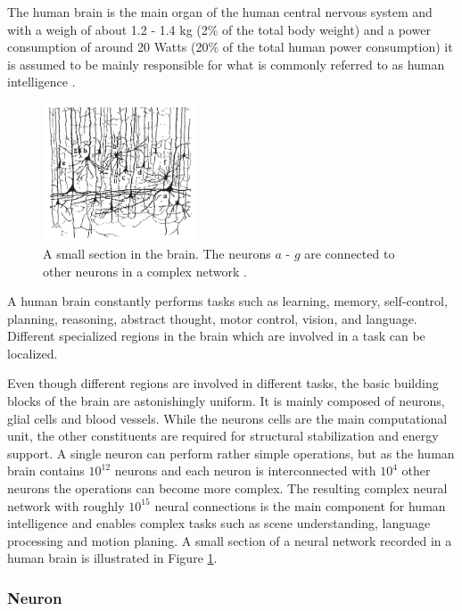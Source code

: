 The human brain is the main organ of the human central nervous system and with a weigh of about 1.2 - 1.4 kg (2\% of the total body weight) and a power consumption of around 20 Watts (20\% of the total human power consumption) it is assumed to be mainly responsible for what is commonly referred to as human intelligence \cite{Byrne1997}\cite{gerstner2014neuronal}.  

\begin{figure}
	\centering
    	\includegraphics[width=0.4\textwidth]{imgs/brain.png} 
    \caption[A small section in the brain.]{A small section in the brain. The neurons $a$ - $g$ are connected to other neurons in a complex network \cite{gerstner2014neuronal}.}
	\label{fig:brain}
\end{figure}

A human brain constantly performs tasks such as learning, memory, self-control, planning, reasoning, abstract thought, motor control, vision, and language.
Different specialized regions in the brain which are involved in a task can be localized. 

Even though different regions are involved in different tasks, the basic building blocks of the brain are astonishingly uniform. 
It is mainly composed of neurons, glial cells and blood vessels.
While the neurons cells are the main computational unit, the other constituents are required for structural stabilization and energy support.
A single neuron can perform rather simple operations, but as the human brain contains $10^{12}$ neurons and each neuron is interconnected with $10^{4}$ other neurons the operations can become more complex.
The resulting complex neural network with roughly $10^{15}$ neural connections is the main component for human intelligence and enables complex tasks such as scene understanding, language processing and motion planing. A small section of a neural network recorded in a human brain is illustrated in Figure \ref{fig:brain}. 

\subsubsection{Neuron} \label{c:natneuron}

